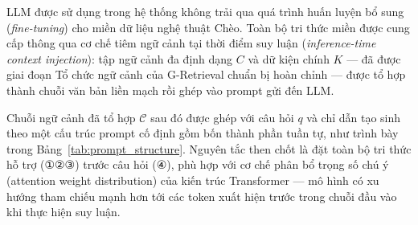 LLM được sử dụng trong hệ thống không trải qua quá trình huấn luyện bổ sung (\textit{fine-tuning}) cho miền dữ liệu nghệ thuật Chèo. Toàn bộ tri thức miền được cung cấp thông qua cơ chế tiêm ngữ cảnh tại thời điểm suy luận (\textit{inference-time context injection}): tập ngữ cảnh đa định dạng $C$ và dữ kiện chính $K$ --- đã được giai đoạn Tổ chức ngữ cảnh của G-Retrieval chuẩn bị hoàn chỉnh --- được tổ hợp thành chuỗi văn bản liền mạch rồi ghép vào prompt gửi đến LLM.

Chuỗi ngữ cảnh đã tổ hợp $\mathcal{C}$ sau đó được ghép với câu hỏi $q$ và chỉ dẫn tạo sinh theo một cấu trúc prompt cố định gồm bốn thành phần tuần tự, như trình bày trong Bảng~\ref{tab:prompt_structure}. Nguyên tắc then chốt là đặt toàn bộ tri thức hỗ trợ (①②③) trước câu hỏi (④), phù hợp với cơ chế phân bổ trọng số chú ý (attention weight distribution) của kiến trúc Transformer --- mô hình có xu hướng tham chiếu mạnh hơn tới các token xuất hiện trước trong chuỗi đầu vào khi thực hiện suy luận.

\begin{table}[ht]
  \centering
  \caption{Các thành phần cấu trúc prompt.}
  \label{tab:prompt_structure}
\end{table}

